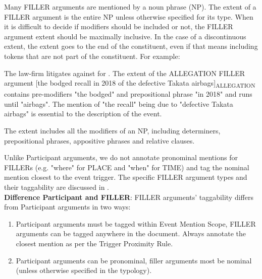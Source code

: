 Many FILLER arguments are mentioned by a noun phrase (NP).
The extent of a FILLER argument is the entire NP unless otherwise specified for its type.
When it is difficult to decide if modifiers should be included or not, the FILLER argument extent should be maximally inclusive.
In the case of a discontinuous extent, the extent goes to the end of the constituent, even if that means including tokens that are not part of the constituent.
For example:
\begin{exe}
    \ex The law-firm litigates  against  for  .
    \expl The extent of the ALLEGATION FILLER argument [the bodged recall in 2018 of the defective Takata airbags]\textsubscript{ALLEGATION} contains pre-modifiers "the bodged" and prepositional phrase "in 2018" and runs until "airbags". The mention of "the recall" being due to "defective Takata airbags" is essential to the description of the event.
\end{exe}

The extent includes all the modifiers of an NP, including determiners, prepositional phrases, appositive phrases and relative clauses.

Unlike Participant arguments, we do not annotate pronominal mentions for FILLERs (e.g. "where" for PLACE and "when" for TIME) and tag the nominal mention closest to the event trigger.
The specific FILLER argument types and their taggability are discussed in .\\[10pt]

\textbf{Difference Participant and FILLER}:
FILLER arguments' taggability differs from Participant arguments in two ways:
\begin{enumerate}[noitemsep, leftmargin=*]
    \item Participant arguments must be tagged within Event Mention Scope, FILLER arguments can be tagged anywhere in the document. Always annotate the closest mention as per the Trigger Proximity Rule.
    \item Participant arguments can be pronominal, filler arguments most be nominal (unless otherwise specified in the typology).
\end{enumerate}
